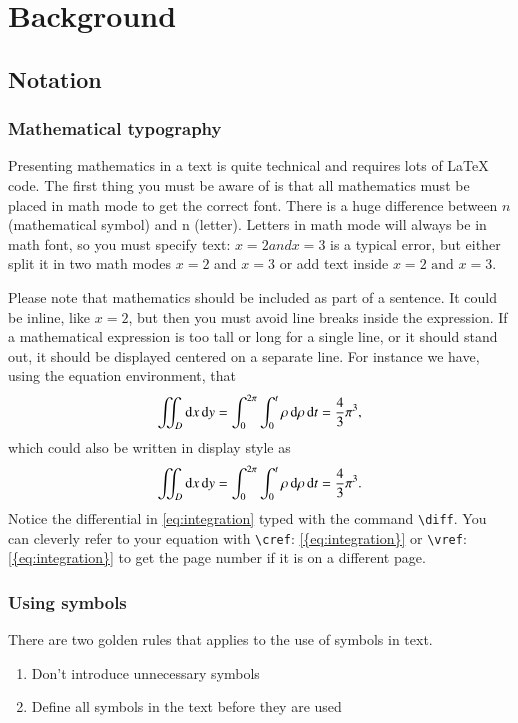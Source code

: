 \chapter{Background}
\label{background}

\section{Notation}
\subsection{Mathematical typography}
Presenting mathematics in a text is quite technical and requires lots of \LaTeX\; code. The first thing you must be aware of is that all mathematics must be placed in math mode to get the correct font. There is a huge difference between $n$ (mathematical symbol) and n (letter). Letters in math mode will always be in math font, so you must specify text: $x=2 and x=3$ is a typical error, but either split it in two math modes $x=2$ and $x=3$ or add text inside $x=2 \text{ and } x=3$. 

Please note that mathematics should be included as part of a sentence. It could be inline, like $x=2$, but then you must avoid line breaks inside the expression. If a mathematical expression is too tall or long for a single line, or it should stand out, it should be displayed centered on a separate line. For instance we have, using the equation environment, that
\begin{equation*}
    \iint_D \dd x \mathop{}\!\mathrm{d} y
    =
    \int_0^{2\pi} \int_0^t \rho \mathop{}\!\mathrm{d} \rho \mathop{}\!\mathrm{d} t
    =
    \frac{4}{3} \pi^3,
    \label{eq:integration}
\end{equation*}
which could also be written in display style as 
\[\iint_D \dd x \mathop{}\!\mathrm{d} y
    =
    \int_0^{2\pi} \int_0^t \rho \mathop{}\!\mathrm{d} \rho \mathop{}\!\mathrm{d} t
    =
    \frac{4}{3} \pi^3.\]
Notice the differential in \cref{eq:integration} typed with the command \texttt{\textbackslash diff}. You can cleverly refer to your equation with \texttt{\textbackslash cref}: \cref{{eq:integration}} or \texttt{\textbackslash vref}: \vref{{eq:integration}} to get the page number if it is on a different page.

\subsection{Using symbols}
 There are two golden rules that applies to the use of symbols in text.
\begin{enumerate}
    \item Don’t introduce unnecessary symbols
    \item Define all symbols in the text before they are used
\end{enumerate}

